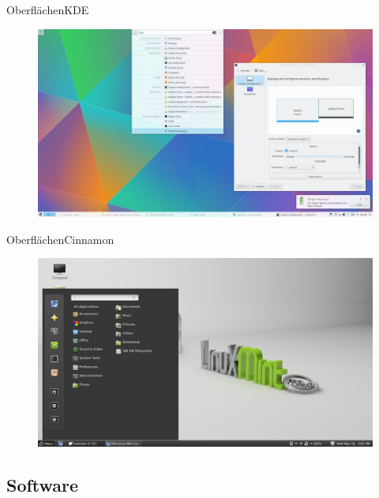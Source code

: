 \begin{frame}{Oberflächen}{KDE}

\begin{figure}
\includegraphics[height=0.6\textheight]{resources/1200px-Kscreen-krunner.png}
\end{figure}


\end{frame}

\begin{frame}{Oberflächen}{Cinnamon}
\begin{figure}
\includegraphics[height=0.6\textheight]{resources/1200px-Linux_Mint.png}
\end{figure}


\end{frame}

\subsection{Software}

